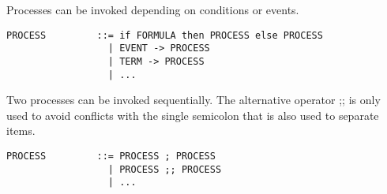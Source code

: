 \documentclass{article}
\begin{document}
Processes can be invoked depending on conditions or events.

\begin{verbatim}
PROCESS         ::= if FORMULA then PROCESS else PROCESS
                  | EVENT -> PROCESS
                  | TERM -> PROCESS
                  | ...
\end{verbatim}

Two processes can be invoked sequentially. The alternative operator ;; is only
used to avoid conflicts with the single semicolon that is also used to
separate items.

\begin{verbatim}
PROCESS         ::= PROCESS ; PROCESS
                  | PROCESS ;; PROCESS
                  | ...
\end{verbatim}
\end{document}
